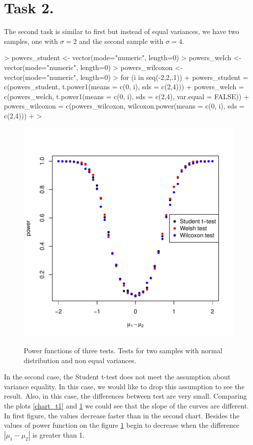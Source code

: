 \documentclass{article}
\begin{document}
  \section{Task 2.}
 The second task is similar to first but instead of equal variances, we have two samples, one with $\sigma=2$ and the second sample with $\sigma=4$.
\begin{Schunk}
\begin{Sinput}
>   powers_student <- vector(mode="numeric", length=0)
>   powers_welch <- vector(mode="numeric", length=0)
>   powers_wilcoxon <- vector(mode="numeric", length=0)
>   for (i in seq(-2,2,.1)){
+     powers_student = c(powers_student, t.power1(means = c(0, i), sds = c(2,4)))
+     powers_welch = c(powers_welch, t.power1(means = c(0, i), sds = c(2,4), var.equal = FALSE))
+     powers_wilcoxon = c(powers_wilcoxon, wilcoxon.power(means = c(0, i), sds = c(2,4)))
+   }
> 
\end{Sinput}
\end{Schunk}
\begin{figure}
\center
\includegraphics{p1-task_2_plot}
\label{chart_t2}
\caption{Power functions of three tests. Tests for two samples with normal distribution and non equal variances.}
\end{figure}
In the second case, the Student t-test does not meet the assumption about variance equality. In this case, we would like to drop this assumption to see the result. Also, in this case, the differences between test are very small. Comparing the plots \ref{chart_t1} and \ref{chart_t2} we could see that the slope of the curves are different. In first figure, the values decrease faster than in the second chart. Besides the values of power function on the figure \ref{chart_t2} begin to decrease when the difference $|\mu_1-\mu_2|$ is greater than 1.
\end{document}
